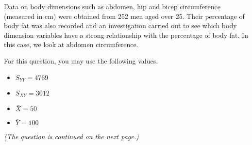Data on body dimensions such as abdomen, hip and bicep circumference (measured in cm) were obtained from 252 men aged over 25. Their percentage of body fat was also recorded and an investigation carried out to see which body dimension variables have a strong relationship with the percentage of body fat. In this case, we look at abdomen circumference. 

\medskip
\noindent For this question, you may use the following values.
\begin{multicols}{3}
	\begin{itemize}
	 $S_{XX} = 3514$ \item $S_{YY} = 4769$ \item  $S_{XY} = 3012$ \item $\bar{X} = 50$  \item $\bar{Y} = 100$  
	\end{itemize}
\end{multicols}
\medskip
\textit{(The question is continued on the next page.)}


